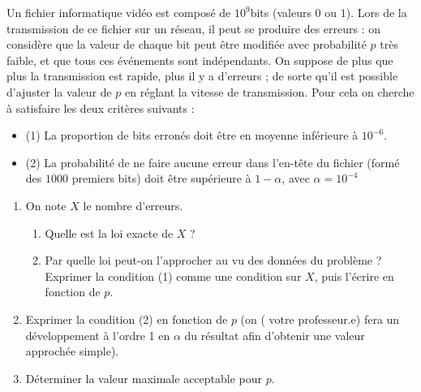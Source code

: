 \documentclass[../PolyS4.tex]{subfiles}
\begin{document}
Un fichier informatique vidéo est composé de $10 ^ 9 $bits (valeurs $0$ ou $1$). Lors de la transmission de ce fichier sur un réseau, il peut se produire des erreurs : on considère que la valeur de chaque bit peut être modifiée avec probabilité $p$ très faible, et que tous ces événements sont indépendants. On suppose de plus que plus la transmission est rapide, plus il y a d'erreurs ;
de sorte qu'il est possible d'ajuster la valeur de $p$ en réglant la vitesse de transmission. Pour
cela on cherche à satisfaire les deux critères suivants :\\
\begin{itemize}
\item (1) La proportion de bits erronés doit être en moyenne inférieure à $10^{-6}$.

\item (2) La probabilité de ne faire aucune erreur dans l'en-tête du fichier (formé des $1000$ premiers
bits) doit être supérieure à $1-\alpha$, avec $\alpha = 10^{-4}$
\end{itemize}

\begin{enumerate}
\item On note $X$ le nombre d'erreurs. 

\begin{enumerate}
\item Quelle est la loi exacte de $X$ ? 
\item Par quelle loi peut-on l'approcher au vu des données du problème ? Exprimer la condition (1) comme une condition sur $X$, puis l'écrire en fonction de $p$.
\end{enumerate}
\item  Exprimer la condition (2) en fonction de $p$ (on ( votre professeur.e)  fera un développement à l'ordre 1 en $\alpha$ du
résultat afin d'obtenir une valeur approchée simple).
\item  Déterminer la valeur maximale acceptable pour $p$.\\
\end{enumerate}
\end{document}
